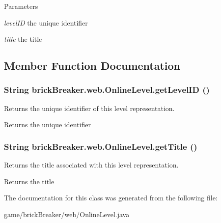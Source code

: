 \begin{DoxyParams}{Parameters}
\item[{\em levelID}]the unique identifier \item[{\em title}]the title \end{DoxyParams}


\subsection{Member Function Documentation}
\hypertarget{classbrick_breaker_1_1web_1_1_online_level_a265cd345985cde1aa244cb739445bbc3}{
\subsubsection[{getLevelID}]{\setlength{\rightskip}{0pt plus 5cm}String brickBreaker.web.OnlineLevel.getLevelID ()}}
\label{classbrick_breaker_1_1web_1_1_online_level_a265cd345985cde1aa244cb739445bbc3}
Returns the unique identifier of this level representation.

\begin{DoxyReturn}{Returns}
the unique identifier 
\end{DoxyReturn}
\hypertarget{classbrick_breaker_1_1web_1_1_online_level_a0a23b746281c6b60e88dab532ab77df4}{
\subsubsection[{getTitle}]{\setlength{\rightskip}{0pt plus 5cm}String brickBreaker.web.OnlineLevel.getTitle ()}}
\label{classbrick_breaker_1_1web_1_1_online_level_a0a23b746281c6b60e88dab532ab77df4}
Returns the title associated with this level representation.

\begin{DoxyReturn}{Returns}
the title 
\end{DoxyReturn}


The documentation for this class was generated from the following file:\begin{DoxyCompactItemize}
\item 
game/brickBreaker/web/OnlineLevel.java\end{DoxyCompactItemize}
